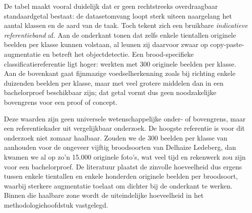 \begin{table}
    \centering
    \caption[Datasetomvang in vergelijkbare studies]{\label{tab:datasetomvang}%
        Trainingsdata in vergelijkbare computervisiestudies rond brood- en
        voedselherkenning. De vermelde aantallen betreffen originele, niet-geaugmenteerde
        beelden. ``gem.'' duidt op een rekenkundig gemiddelde, berekend over een dataset die niet noodzakelijk
        gelijk over de klassen verdeeld is.\autocite{Tantiphanwadi2022,Schmitt2025,Boyd2024}.}
\end{table}


De tabel maakt vooral duidelijk dat er geen rechtstreeks overdraagbaar standaardgetal
bestaat: de datasetomvang loopt sterk uiteen naargelang het aantal klassen en de aard
van de taak. Toch tekent zich een bruikbare \emph{indicatieve referentieband} af. Aan
de onderkant tonen \textcite{Schmitt2025} dat zelfs enkele tientallen originele beelden
per klasse kunnen volstaan, al leunen zij daarvoor zwaar op copy-paste-augmentatie en
betreft het objectdetectie. Een brood-specifieke classificatiereferentie ligt hoger:
\textcite{Tantiphanwadi2022} werkten met 300 originele beelden per klasse. Aan de
bovenkant gaat fijnmazige voedselherkenning zoals bij \textcite{Boyd2024} richting
enkele duizenden beelden per klasse, maar met veel grotere middelen dan in een
bachelorproef beschikbaar zijn; dat getal vormt dus geen noodzakelijke bovengrens voor
een proof of concept.


Deze waarden zijn geen universele wetenschappelijke onder- of bovengrens, maar
een referentiekader uit vergelijkbaar onderzoek. De hoogste referentie is voor dit onderzoek niet zomaar
haalbaar. Zouden we de 300 beelden per klasse
van \textcite{Tantiphanwadi2022} aanhouden voor de ongeveer vijftig broodsoorten van
Delhaize Ledeberg, dan kwamen we al op zo'n 15.000 originele foto's, wat veel tijd en rekenwerk zou zijn voor een bachelorproef. De literatuur plaatst de
zinvolle hoeveelheid dus ergens tussen enkele tientallen en enkele honderden originele
beelden per broodsoort, waarbij sterkere augmentatie toelaat om dichter bij de
onderkant te werken. Binnen die haalbare zone wordt de
uiteindelijke hoeveelheid in het methodologiehoofdstuk vastgelegd.


